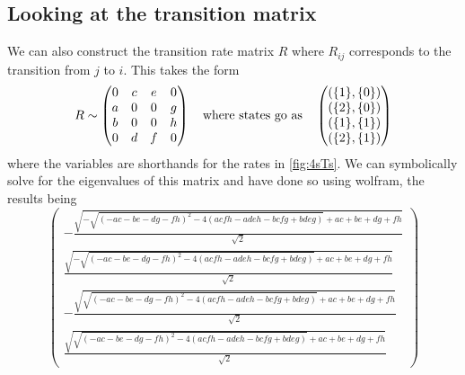 \documentclass[11pt]{article}
\newcommand\set[1]{\ensuremath{\{#1\}}}
\begin{document}
\subsection{Looking at the transition matrix}
We can also construct the transition rate matrix $R$ where $R_{ij}$ corresponds to the transition from $j$ to $i$.
This takes the form
\begin{align}
R \sim \begin{pmatrix}
0 & c & e & 0 \\
a & 0 & 0 & g \\
b & 0 & 0 & h \\
0 & d & f & 0 \\
\end{pmatrix} \qq{where states go as} \begin{pmatrix}
    (\set{1}, \set{0}) \\
    (\set{2}, \set{0}) \\
    (\set{1}, \set{1}) \\
    (\set{2}, \set{1})
\end{pmatrix}
\end{align}
where the variables are shorthands for the rates in \cref{fig:4sTs}.
We can symbolically solve for the eigenvalues of this matrix and have done so using wolfram, the results being
\begin{equation}
    \begin{pmatrix}
        -\frac{\sqrt{-\sqrt{(-a c-b e-d g-f h)^2-4 (a c f h-a d e h-b c f g+b d e g)}+a c+b e+d g+f h}}{\sqrt{2}} \\
        \frac{\sqrt{-\sqrt{(-a c-b e-d g-f h)^2-4 (a c f h-a d e h-b c f g+b d e g)}+a c+b e+d g+f h}}{\sqrt{2}} \\
        -\frac{\sqrt{\sqrt{(-a c-b e-d g-f h)^2-4 (a c f h-a d e h-b c f g+b d e g)}+a c+b e+d g+f h}}{\sqrt{2}} \\
        \frac{\sqrt{\sqrt{(-a c-b e-d g-f h)^2-4 (a c f h-a d e h-b c f g+b d e g)}+a c+b e+d g+f h}}{\sqrt{2}}
    \end{pmatrix}
\end{equation}
\end{document}
